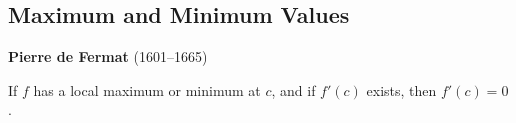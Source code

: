 \subsection{Maximum and Minimum Values}
\textbf{Pierre de Fermat} (1601--1665)
\begin{theorem}
    If \(f\) has a local maximum or minimum at \(c\), and if \(f'(c)\) exists,
    then \(f'(c)=0\).
\end{theorem}